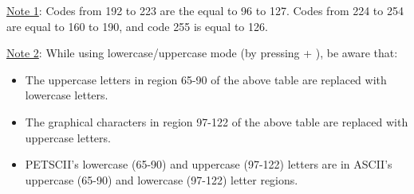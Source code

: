 \underline{Note 1}: Codes from 192 to 223 are the equal to 96 to 127. Codes from 224 to 254 are equal to 160 to 190,
and code 255 is equal to 126.

\underline{Note 2}: While using lowercase/uppercase mode (by pressing \megasymbolkey + ), be aware that:
\begin{itemize}
  \item The uppercase letters in region 65-90 of the above table are replaced with lowercase letters.
  \item The graphical characters in region 97-122 of the above table are replaced with uppercase letters.
  \item PETSCII's lowercase (65-90) and uppercase (97-122) letters are in ASCII's uppercase (65-90) and lowercase (97-122) letter regions.
\end{itemize}


